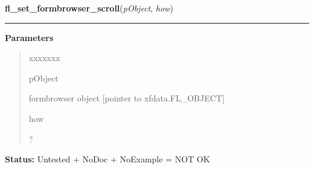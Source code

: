 \hspace{.8\funcindent}\begin{boxedminipage}{\funcwidth}

    \raggedright \textbf{fl\_set\_formbrowser\_scroll}(\textit{pObject}, \textit{how})

    \vspace{-1.5ex}

    \rule{\textwidth}{0.5\fboxrule}
\setlength{\parskip}{2ex}
\setlength{\parskip}{1ex}
      \textbf{Parameters}
      \vspace{-1ex}

      \begin{quote}
        \begin{Ventry}{xxxxxxx}

          \item[pObject]

          formbrowser object [pointer to xfdata.FL\_OBJECT]

          \item[how]

          ?

        \end{Ventry}

      \end{quote}

\textbf{Status:} Untested + NoDoc + NoExample = NOT OK



    \end{boxedminipage}

    \label{xformslib:library:fl_set_formbrowser_hscrollbar}

    \vspace{0.5ex}

